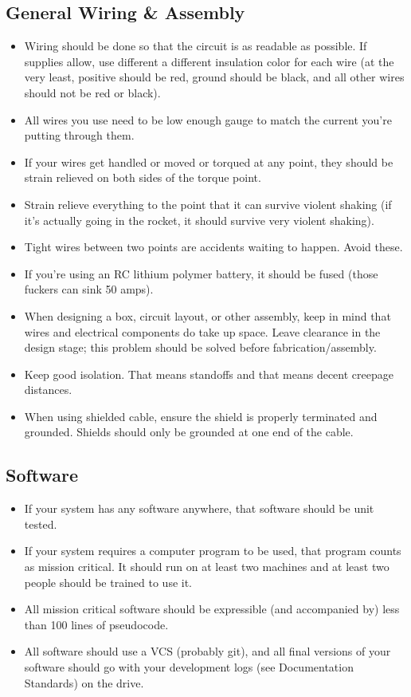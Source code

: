 \documentclass{article}
\begin{document}
\subsection{General Wiring \& Assembly}
\begin{itemize}
\item Wiring should be done so that the circuit is as readable as possible. If supplies allow, use different a different insulation color for each wire (at the very least, positive should be red, ground should be black, and all other wires should not be red or black).
\item All wires you use need to be low enough gauge to match the current you're putting through them.
\item If your wires get handled or moved or torqued at any point, they should be strain relieved on both sides of the torque point.
\item Strain relieve everything to the point that it can survive violent shaking (if it's actually going in the rocket, it should survive very violent shaking).
\item Tight wires between two points are accidents waiting to happen. Avoid these.
\item If you're using an RC lithium polymer battery, it should be fused (those fuckers can sink 50 amps).
\item When designing a box, circuit layout, or other assembly, keep in mind that wires and electrical components do take up space. Leave clearance in the design stage; this problem should be solved before fabrication/assembly.
\item Keep good isolation. That means standoffs and that means decent creepage distances.
\item When using shielded cable, ensure the shield is properly terminated and grounded. Shields should only be grounded at one end of the cable.
\end{itemize}

\subsection{Software}
\begin{itemize}
\item If your system has any software anywhere, that software should be unit tested.
\item If your system requires a computer program to be used, that program counts as mission critical. It should run on at least two machines and at least two people should be trained to use it.
\item All mission critical software should be expressible (and accompanied by) less than 100 lines of pseudocode.
\item All software should use a VCS (probably git), and all final versions of your software should go with your development logs (see Documentation Standards) on the drive.
\end{itemize}
\end{document}

